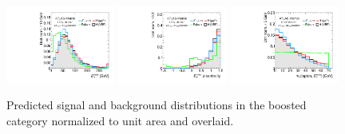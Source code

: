 \begin{figure}[tp]
  \includegraphics[width=0.32\textwidth]{figures/overlaid/boost/met-pt-hi}
  \includegraphics[width=0.32\textwidth]{figures/overlaid/boost/met-phi-centrality}
  \includegraphics[width=0.32\textwidth]{figures/overlaid/boost/mT} \\
  \caption{Predicted signal and background distributions in the boosted category normalized to unit area and overlaid.}
  \label{fig:strategy-overlaid-boost-1}
\end{figure}
